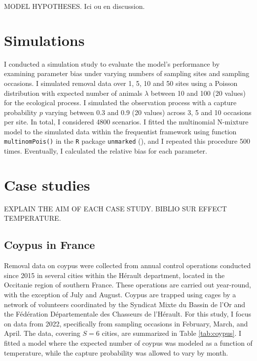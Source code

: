 \documentclass[
  11pt,
  a4paper,
]{article}
\begin{document}
MODEL HYPOTHESES. Ici ou en discussion.

\section{Simulations}\label{simulations}

I conducted a simulation study to evaluate the model's performance by examining parameter bias under varying numbers of sampling sites and sampling occasions. I simulated removal data over 1, 5, 10 and 50 sites using a Poisson distribution with expected number of animals \(\lambda\) between 10 and 100 (20 values) for the ecological process. I simulated the observation process with a capture probability \(p\) varying between 0.3 and 0.9 (20 values) across 3, 5 and 10 occasions per site. In total, I considered 4800 scenarios. I fitted the multinomial N-mixture model to the simulated data within the frequentist framework using function \texttt{multinomPois()} in the \texttt{R} package \texttt{unmarked} (), and I repeated this procedure 500 times. Eventually, I calculated the relative bias for each parameter.

\section{Case studies}\label{case-studies}

EXPLAIN THE AIM OF EACH CASE STUDY. BIBLIO SUR EFFECT TEMPERATURE.

\subsection{Coypus in France}\label{coypus-in-france}

Removal data on coypus were collected from annual control operations conducted since 2015 in several cities within the Hérault department, located in the Occitanie region of southern France. These operations are carried out year-round, with the exception of July and August. Coypus are trapped using cages by a network of volunteers coordinated by the Syndicat Mixte du Bassin de l'Or and the Fédération Départementale des Chasseurs de l'Hérault. For this study, I focus on data from 2022, specifically from sampling occasions in February, March, and April. The data, covering \(S = 6\) cities, are summarized in Table \ref{tab:coypus}. I fitted a model where the expected number of coypus was modeled as a function of temperature, while the capture probability was allowed to vary by month.
\end{document}

